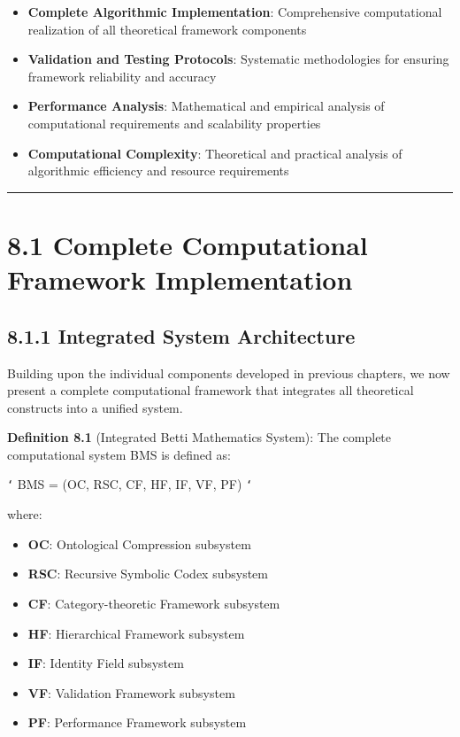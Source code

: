 \begin{itemize}
\item \textbf{Complete Algorithmic Implementation}: Comprehensive computational realization of all theoretical framework components
\item \textbf{Validation and Testing Protocols}: Systematic methodologies for ensuring framework reliability and accuracy
\item \textbf{Performance Analysis}: Mathematical and empirical analysis of computational requirements and scalability properties
\item \textbf{Computational Complexity}: Theoretical and practical analysis of algorithmic efficiency and resource requirements
\end{itemize}

\hrule

\section{8.1 Complete Computational Framework Implementation}

\subsection{8.1.1 Integrated System Architecture}

Building upon the individual components developed in previous chapters, we now present a complete computational framework that integrates all theoretical constructs into a unified system.

\textbf{Definition 8.1} (Integrated Betti Mathematics System): The complete computational system BMS is defined as:

\texttt{`}
BMS = (OC, RSC, CF, HF, IF, VF, PF)
\texttt{`}

where:
\begin{itemize}
\item \textbf{OC}: Ontological Compression subsystem
\item \textbf{RSC}: Recursive Symbolic Codex subsystem  
\item \textbf{CF}: Category-theoretic Framework subsystem
\item \textbf{HF}: Hierarchical Framework subsystem
\item \textbf{IF}: Identity Field subsystem
\item \textbf{VF}: Validation Framework subsystem
\item \textbf{PF}: Performance Framework subsystem
\end{itemize}

